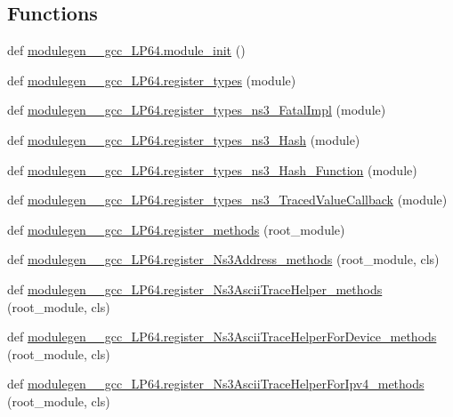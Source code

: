 \subsection*{Functions}
\begin{DoxyCompactItemize}
\item 
def \hyperlink{namespacemodulegen____gcc__LP64_a6fa3bcd89827bb55aea467ffebc10531}{modulegen\+\_\+\+\_\+gcc\+\_\+\+L\+P64.\+module\+\_\+init} ()
\item 
def \hyperlink{namespacemodulegen____gcc__LP64_ab61bb54af74e931fcb41c8f8677a8eb5}{modulegen\+\_\+\+\_\+gcc\+\_\+\+L\+P64.\+register\+\_\+types} (module)
\item 
def \hyperlink{namespacemodulegen____gcc__LP64_a2262e0d4e35e243aa3a1da10a2cb4e41}{modulegen\+\_\+\+\_\+gcc\+\_\+\+L\+P64.\+register\+\_\+types\+\_\+ns3\+\_\+\+Fatal\+Impl} (module)
\item 
def \hyperlink{namespacemodulegen____gcc__LP64_a93555c52620e0de62d76d0946d4554a2}{modulegen\+\_\+\+\_\+gcc\+\_\+\+L\+P64.\+register\+\_\+types\+\_\+ns3\+\_\+\+Hash} (module)
\item 
def \hyperlink{namespacemodulegen____gcc__LP64_a3e77b4168f4d6176242961c3f3cd12f0}{modulegen\+\_\+\+\_\+gcc\+\_\+\+L\+P64.\+register\+\_\+types\+\_\+ns3\+\_\+\+Hash\+\_\+\+Function} (module)
\item 
def \hyperlink{namespacemodulegen____gcc__LP64_a932218c26ce11fb1473ffc3980f37614}{modulegen\+\_\+\+\_\+gcc\+\_\+\+L\+P64.\+register\+\_\+types\+\_\+ns3\+\_\+\+Traced\+Value\+Callback} (module)
\item 
def \hyperlink{namespacemodulegen____gcc__LP64_a8ac8e0786047c1ed08fed9bc1a45843d}{modulegen\+\_\+\+\_\+gcc\+\_\+\+L\+P64.\+register\+\_\+methods} (root\+\_\+module)
\item 
def \hyperlink{namespacemodulegen____gcc__LP64_a0bc87667cfe5a45fc4aa7c0de2ae51d2}{modulegen\+\_\+\+\_\+gcc\+\_\+\+L\+P64.\+register\+\_\+\+Ns3\+Address\+\_\+methods} (root\+\_\+module, cls)
\item 
def \hyperlink{namespacemodulegen____gcc__LP64_adaa3b88859141e10907c6d889f64e0b2}{modulegen\+\_\+\+\_\+gcc\+\_\+\+L\+P64.\+register\+\_\+\+Ns3\+Ascii\+Trace\+Helper\+\_\+methods} (root\+\_\+module, cls)
\item 
def \hyperlink{namespacemodulegen____gcc__LP64_adda67a3ef2e83d325cf96ae6d4960d43}{modulegen\+\_\+\+\_\+gcc\+\_\+\+L\+P64.\+register\+\_\+\+Ns3\+Ascii\+Trace\+Helper\+For\+Device\+\_\+methods} (root\+\_\+module, cls)
\item 
def \hyperlink{namespacemodulegen____gcc__LP64_a6b7e27c091e7d584e7c4ca55cec8f9d0}{modulegen\+\_\+\+\_\+gcc\+\_\+\+L\+P64.\+register\+\_\+\+Ns3\+Ascii\+Trace\+Helper\+For\+Ipv4\+\_\+methods} (root\+\_\+module, cls)

\end{DoxyCompactItemize}
